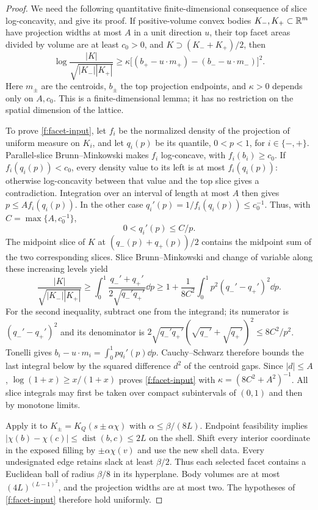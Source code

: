 \begin{proof}
We need the following quantitative finite-dimensional consequence of
slice log-concavity, and give its proof.
If positive-volume convex bodies $K_-,K_+\subset\mathbb R^m$
have projection widths at most $A$ in a unit direction $u$, their top
facet areas divided by volume are at least $c_0>0$, and
$K\supset(K_-+K_+)/2$, then
\begin{equation}\label{f:facet-input}
 \log\frac{|K|}{\sqrt{|K_-||K_+|}}
 \ge\kappa\bigl[(b_+-u\cdot m_+)-(b_--u\cdot m_-)\bigr]^2.
\end{equation}
Here $m_\pm$ are the centroids, $b_\pm$ the top projection endpoints,
and $\kappa>0$ depends only on $A,c_0$. This is a finite-dimensional lemma;
it has no restriction on the spatial dimension of the lattice.

To prove \eqref{f:facet-input}, let $f_i$ be the normalized density
of the projection of uniform measure on $K_i$, and let $q_i(p)$
be its quantile, $0<p<1$, for $i\in\{-,+\}$. Parallel-slice
Brunn--Minkowski makes $f_i$ log-concave, with $f_i(b_i)\ge c_0$.
If $f_i(q_i(p))<c_0$, every density value to its left is at most
$f_i(q_i(p))$: otherwise log-concavity between that value and the
top slice gives a contradiction. Integration over an interval of
length at most $A$ then gives $p\le A f_i(q_i(p))$.
In the other case $q_i'(p)=1/f_i(q_i(p))\le c_0^{-1}$.
Thus, with $C=\max\{A,c_0^{-1}\}$,
\[
 0<q_i'(p)\le C/p.
\]
The midpoint slice of $K$ at $(q_-(p)+q_+(p))/2$ contains the
midpoint sum of the two corresponding slices. Slice
Brunn--Minkowski and change of variable along these increasing
levels yield
\[
 \frac{|K|}{\sqrt{|K_-||K_+|}}
 \ge\int_0^1\frac{q_-'+q_+'}{2\sqrt{q_-'q_+'}}\dd p
 \ge1+\frac1{8C^2}\int_0^1p^2(q_-'-q_+')^2\dd p.
\]
For the second inequality, subtract one from the integrand; its
numerator is $(q_-'-q_+')^2$ and its denominator is
$2\sqrt{q_-'q_+'}(\sqrt{q_-'}+\sqrt{q_+'})^2\le8C^2/p^2$.
Tonelli gives
$b_i-u\cdot m_i=\int_0^1p q_i'(p)\dd p$.
Cauchy--Schwarz therefore bounds the last integral below by the
squared difference $d^2$ of the centroid gaps. Since $|d|\le A$,
$\log(1+x)\ge x/(1+x)$ proves \eqref{f:facet-input} with
$\kappa=(8C^2+A^2)^{-1}$. All slice integrals may first be taken
over compact subintervals of $(0,1)$ and then by monotone limits.

Apply it to $K_\pm=K_Q(s\pm\alpha\chi)$ with
$\alpha\le\beta/(8L)$. Endpoint feasibility implies
$|\chi(b)-\chi(c)|\le\operatorname{dist}(b,c)\le2L$ on the shell.
Shift every interior coordinate in the exposed filling by
$\pm\alpha\chi(v)$ and use the new shell data. Every undesignated edge
retains slack at least $\beta/2$. Thus each selected facet contains a
Euclidean ball of radius $\beta/8$ in its hyperplane. Body volumes are at
most $(4L)^{(L-1)^2}$, and the projection widths are at most two.
The hypotheses of \eqref{f:facet-input} therefore hold uniformly.


\end{proof}

